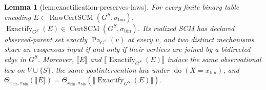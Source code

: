 \documentclass{article}
\newtheorem{lemma}{Lemma}
\begin{document}
\begin{lemma}[lem:exactification-preserves-laws]\label{lem:exactification-preserves-laws}
For every finite binary table encoding \(E\in\operatorname{RawCertSCM}(G^S,\sigma_{\mathrm{bin}})\), \(\operatorname{Exactify}_{G^S}(E)\in\operatorname{CertSCM}(G^S,\sigma_{\mathrm{bin}})\). Its realized SCM has declared observed-parent set exactly \(\operatorname{Pa}_{G^S}(v)\) at every \(v\), and two distinct mechanisms share an exogenous input if and only if their vertices are joined by a bidirected edge in \(G^S\). Moreover, \(\llbracket E\rrbracket\) and \(\llbracket\operatorname{Exactify}_{G^S}(E)\rrbracket\) induce the same observational law on \(V\cup\{S\}\), the same postintervention law under \(\operatorname{do}(X=x_{\mathrm{bin}})\), and \(\Theta_{x_{\mathrm{bin}},\sigma_{\mathrm{bin}}}(\llbracket E\rrbracket)=\Theta_{x_{\mathrm{bin}},\sigma_{\mathrm{bin}}}(\llbracket\operatorname{Exactify}_{G^S}(E)\rrbracket)\).
\end{lemma}
\end{document}
